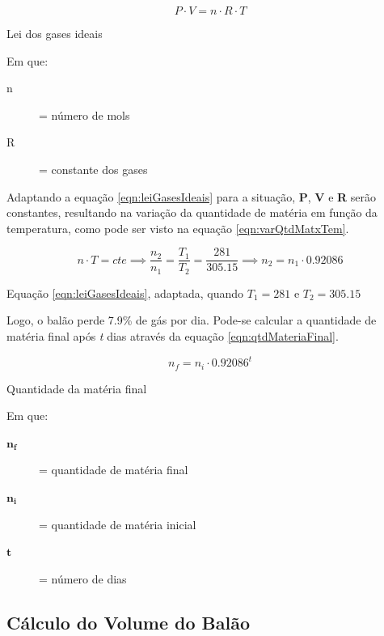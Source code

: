 		\begin{equacao}
		  \begin{equation}
		    P \cdot V = n \cdot R \cdot T
		  \end{equation}
		  \caption{Lei dos gases ideais}
		  \label{eqn:leiGasesIdeais}
		\end{equacao}

		Em que:
		\begin{description}
			\item[n] = número de mols
			\item[R] = constante dos gases
		\end{description}

		Adaptando a equação \eqref{eqn:leiGasesIdeais} para a situação, \textbf{P}, \textbf{V} e \textbf{R} serão constantes, resultando na variação da quantidade de matéria em função da temperatura, como pode ser visto na equação \eqref{eqn:varQtdMatxTem}.

		\begin{equacao}
		  \begin{equation}
		    n \cdot T = cte \implies \frac{n_{2}}{n_{1}} = \frac{T_{1}}{T_{2}} = \frac{281}{305.15} \implies n_{2} = n_{1} \cdot 0.92086
		  \end{equation}
		  \caption{Equação \eqref{eqn:leiGasesIdeais}, adaptada, quando $T_{1} = 281$ e $T_{2} = 305.15$}
		  \label{eqn:varQtdMatxTem}
		\end{equacao}

		Logo, o balão perde 7.9\% de gás por dia. Pode-se calcular a quantidade de matéria final após \textit{t} dias através da equação \eqref{eqn:qtdMateriaFinal}.

		\begin{equacao}
		  \begin{equation}
		    n_{f} = n_{i} \cdot 0.92086^t
		  \end{equation}
		  \caption{Quantidade da matéria final}
		  \label{eqn:qtdMateriaFinal}
		\end{equacao}

		Em que:
		\begin{description}
			\item[$\boldsymbol{n_{f}}$] = quantidade de matéria final
			\item[$\boldsymbol{n_{i}}$] = quantidade de matéria inicial
			\item[$\boldsymbol{t}$] = número de dias
		\end{description}

\subsection{Cálculo  do Volume do Balão} %
\label{sub:c_lculo_do_volume_do_bal_o}

